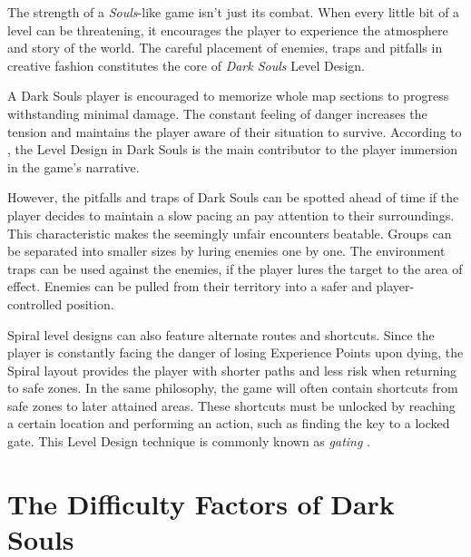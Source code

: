 The strength of a \emph{Souls}-like game isn't just its combat. When every little bit of a level can be threatening, it encourages the player to experience the atmosphere and story of the world. The careful placement of enemies, traps and pitfalls in creative fashion constitutes the core of \emph{Dark Souls} Level Design.

A Dark Souls player is encouraged to memorize whole map sections to progress withstanding minimal damage. The constant feeling of danger increases the tension and maintains the player aware of their situation to survive. According to , the Level Design in  Dark Souls is the main contributor to the player immersion in the game's narrative.

However, the pitfalls and traps of Dark Souls can be spotted ahead of time if the player decides to maintain a slow pacing an pay attention to their surroundings. This characteristic makes the seemingly unfair encounters beatable. Groups can be separated into smaller sizes by luring enemies one by one. The environment traps can be used against the enemies, if the player lures the target to the area of effect. Enemies can be pulled from their territory into a safer and player-controlled position.

Spiral level designs can also feature alternate routes and shortcuts. Since the player is constantly facing the danger of losing Experience Points upon dying, the Spiral layout provides the player with shorter paths and less risk when returning to safe zones. In the same philosophy, the game will often contain shortcuts from safe zones to later attained areas. These shortcuts must be unlocked by reaching a certain location and performing an action, such as finding the key to a locked gate. This Level Design technique is commonly known as \emph{gating} \cite{BOOK_LevelUpTheGuideToGreat}.


\section{The Difficulty Factors of Dark Souls}
\label{sec:pain-points-dark-souls}


